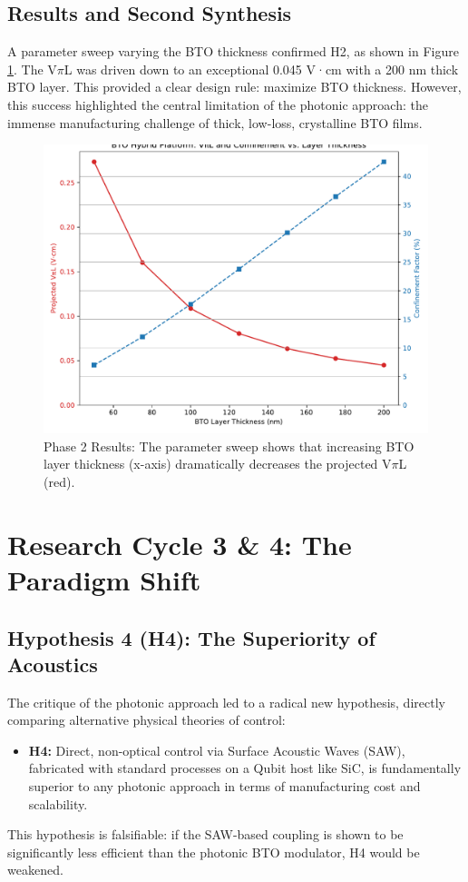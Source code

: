 \documentclass{article}
\begin{document}
\subsection{Results and Second Synthesis}
A parameter sweep varying the BTO thickness confirmed H2, as shown in Figure \ref{fig:sweep}. The V$\pi$L was driven down to an exceptional 0.045 V·cm with a 200 nm thick BTO layer. This provided a clear design rule: maximize BTO thickness. However, this success highlighted the central limitation of the photonic approach: the immense manufacturing challenge of thick, low-loss, crystalline BTO films.

\begin{figure}[H]
    \centering
    \includegraphics[width=0.9\linewidth]{simulation_v2_optimization_sweep.pdf}
    \caption{Phase 2 Results: The parameter sweep shows that increasing BTO layer thickness (x-axis) dramatically decreases the projected V$\pi$L (red).}
    \label{fig:sweep}
\end{figure}

\section{Research Cycle 3 \& 4: The Paradigm Shift}
\subsection{Hypothesis 4 (H4): The Superiority of Acoustics}
The critique of the photonic approach led to a radical new hypothesis, directly comparing alternative physical theories of control:
\begin{itemize}
    \item \textbf{H4:} Direct, non-optical control via Surface Acoustic Waves (SAW), fabricated with standard processes on a Qubit host like SiC, is fundamentally superior to any photonic approach in terms of manufacturing cost and scalability.
\end{itemize}
This hypothesis is falsifiable: if the SAW-based coupling is shown to be significantly less efficient than the photonic BTO modulator, H4 would be weakened.
\end{document}
